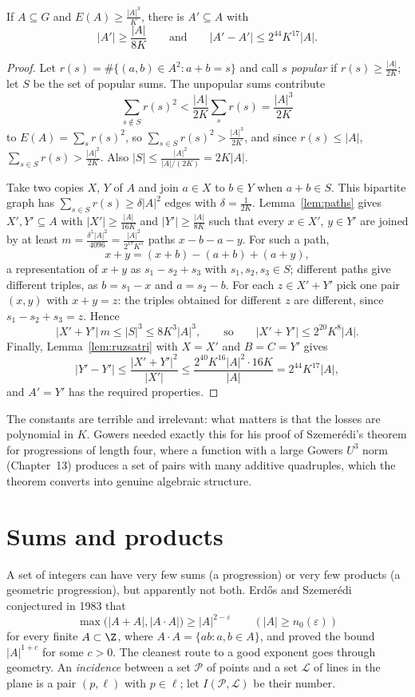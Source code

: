 \begin{theorem}\label{thm:bsg}
If $A\subseteq G$ and $E(A)\ge\frac{|A|^3}K$, there is $A'\subseteq A$ with
\[
|A'|\ge\frac{|A|}{8K}\qquad\text{and}\qquad|A'-A'|\le2^{44}K^{17}|A|.
\]
\end{theorem}
\begin{proof}
Let $r(s)=\#\{(a,b)\in A^2:a+b=s\}$ and call $s$ \emph{popular} if $r(s)\ge\frac{|A|}{2K}$; let $S$ be the set of popular sums. The unpopular sums contribute
\[
\sum_{s\notin S}r(s)^2<\frac{|A|}{2K}\sum_sr(s)=\frac{|A|^3}{2K}
\]
to $E(A)=\sum_sr(s)^2$, so $\sum_{s\in S}r(s)^2>\frac{|A|^3}{2K}$, and since $r(s)\le|A|$, $\sum_{s\in S}r(s)>\frac{|A|^2}{2K}$. Also $|S|\le\frac{|A|^2}{|A|/(2K)}=2K|A|$.

Take two copies $X$, $Y$ of $A$ and join $a\in X$ to $b\in Y$ when $a+b\in S$. This bipartite graph has $\sum_{s\in S}r(s)\ge\delta|A|^2$ edges with $\delta=\frac1{2K}$. Lemma~\ref{lem:paths} gives $X',Y'\subseteq A$ with $|X'|\ge\frac{|A|}{16K}$ and $|Y'|\ge\frac{|A|}{8K}$ such that every $x\in X'$, $y\in Y'$ are joined by at least $m=\frac{\delta^5|A|^2}{4096}=\frac{|A|^2}{2^{17}K^5}$ paths $x-b-a-y$. For such a path,
\[
x+y=(x+b)-(a+b)+(a+y),
\]
a representation of $x+y$ as $s_1-s_2+s_3$ with $s_1,s_2,s_3\in S$; different paths give different triples, as $b=s_1-x$ and $a=s_2-b$. For each $z\in X'+Y'$ pick one pair $(x,y)$ with $x+y=z$: the triples obtained for different $z$ are different, since $s_1-s_2+s_3=z$. Hence
\[
|X'+Y'|\,m\le|S|^3\le8K^3|A|^3,\qquad\text{so}\qquad|X'+Y'|\le2^{20}K^8|A|.
\]
Finally, Lemma~\ref{lem:ruzsatri} with $X=X'$ and $B=C=Y'$ gives
\[
|Y'-Y'|\le\frac{|X'+Y'|^2}{|X'|}\le\frac{2^{40}K^{16}|A|^2\cdot16K}{|A|}=2^{44}K^{17}|A|,
\]
and $A'=Y'$ has the required properties.
\end{proof}

The constants are terrible and irrelevant: what matters is that the losses are polynomial in $K$. Gowers needed exactly this for his proof of Szemerédi's theorem for progressions of length four, where a function with a large Gowers $U^3$ norm (Chapter~13) produces a set of pairs with many additive quadruples, which the theorem converts into genuine algebraic structure.

\section{Sums and products}

A set of integers can have very few sums (a progression) or very few products (a geometric progression), but apparently not both. Erdős and Szemerédi conjectured in 1983 that
\[
\max\bigl(|A+A|,|A\cdot A|\bigr)\ge|A|^{2-\varepsilon}\qquad(|A|\ge n_0(\varepsilon))
\]
for every finite $A\subset\Z$, where $A\cdot A=\{ab:a,b\in A\}$, and proved the bound $|A|^{1+c}$ for some $c>0$. The cleanest route to a good exponent goes through geometry. An \emph{incidence} between a set $\mathcal P$ of points and a set $\mathcal L$ of lines in the plane is a pair $(p,\ell)$ with $p\in\ell$; let $I(\mathcal P,\mathcal L)$ be their number.

